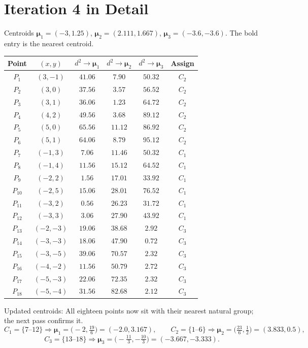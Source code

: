 \documentclass[11pt,a4paper]{report}
\theoremstyle{definition}
\theoremstyle{plain}
\theoremstyle{remark}
\newcommand{\vmu}{\bm{\mu}}
\begin{document}
	\section{Iteration 4 in Detail}
	Centroids $\vmu_1=(-3,1.25)$, $\vmu_2=(2.111,1.667)$, $\vmu_3=(-3.6,-3.6)$. The bold entry is the nearest centroid.
	\begin{center}
	\small
	\begin{tabular}{@{}ccccc c@{}}
	\toprule
	Point & $(x,y)$ & $d^2\!\to\vmu_1$ & $d^2\!\to\vmu_2$ & $d^2\!\to\vmu_3$ & Assign\\
	\midrule
	$P_{1}$ & $(3,-1)$ & $41.06$ & $\mathbf{7.90}$ & $50.32$ & $C_2$\\
	$P_{2}$ & $(3,0)$ & $37.56$ & $\mathbf{3.57}$ & $56.52$ & $C_2$\\
	$P_{3}$ & $(3,1)$ & $36.06$ & $\mathbf{1.23}$ & $64.72$ & $C_2$\\
	$P_{4}$ & $(4,2)$ & $49.56$ & $\mathbf{3.68}$ & $89.12$ & $C_2$\\
	$P_{5}$ & $(5,0)$ & $65.56$ & $\mathbf{11.12}$ & $86.92$ & $C_2$\\
	$P_{6}$ & $(5,1)$ & $64.06$ & $\mathbf{8.79}$ & $95.12$ & $C_2$\\
	$P_{7}$ & $(-1,3)$ & $\mathbf{7.06}$ & $11.46$ & $50.32$ & $C_1$\\
	$P_{8}$ & $(-1,4)$ & $\mathbf{11.56}$ & $15.12$ & $64.52$ & $C_1$\\
	$P_{9}$ & $(-2,2)$ & $\mathbf{1.56}$ & $17.01$ & $33.92$ & $C_1$\\
	$P_{10}$ & $(-2,5)$ & $\mathbf{15.06}$ & $28.01$ & $76.52$ & $C_1$\\
	$P_{11}$ & $(-3,2)$ & $\mathbf{0.56}$ & $26.23$ & $31.72$ & $C_1$\\
	$P_{12}$ & $(-3,3)$ & $\mathbf{3.06}$ & $27.90$ & $43.92$ & $C_1$\\
	$P_{13}$ & $(-2,-3)$ & $19.06$ & $38.68$ & $\mathbf{2.92}$ & $C_3$\\
	$P_{14}$ & $(-3,-3)$ & $18.06$ & $47.90$ & $\mathbf{0.72}$ & $C_3$\\
	$P_{15}$ & $(-3,-5)$ & $39.06$ & $70.57$ & $\mathbf{2.32}$ & $C_3$\\
	$P_{16}$ & $(-4,-2)$ & $11.56$ & $50.79$ & $\mathbf{2.72}$ & $C_3$\\
	$P_{17}$ & $(-5,-3)$ & $22.06$ & $72.35$ & $\mathbf{2.32}$ & $C_3$\\
	$P_{18}$ & $(-5,-4)$ & $31.56$ & $82.68$ & $\mathbf{2.12}$ & $C_3$\\
	\bottomrule
	\end{tabular}
	\end{center}
	Updated centroids: All eighteen points now sit with their nearest natural group; the next pass confirms it.
	\[
C_1=\{7\text{--}12\}\Rightarrow\vmu_1=\bigl(-2,\tfrac{19}{6}\bigr)=(-2.0,3.167),\qquad
C_2=\{1\text{--}6\}\Rightarrow\vmu_2=\bigl(\tfrac{23}{6},\tfrac{1}{2}\bigr)=(3.833,0.5),
\]
\[
C_3=\{13\text{--}18\}\Rightarrow\vmu_3=\bigl(-\tfrac{11}{3},-\tfrac{10}{3}\bigr)=(-3.667,-3.333).
\]
	
\end{document}
